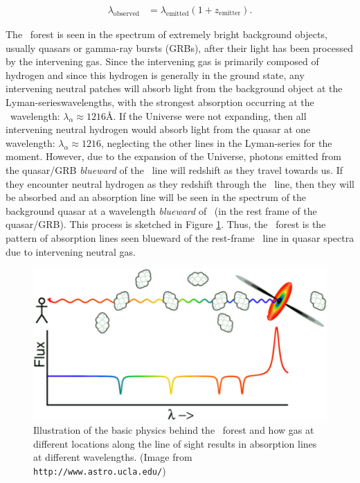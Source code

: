 \begin{align}
\lambda_{\text{observed}} &= \lambda_{\text{emitted}}(1+z_{\text{emitter}}). 
\end{align}

The \lya\ forest is seen in the spectrum of extremely bright background objects, usually quasars  or gamma-ray bursts (GRBs), after their light has been processed by the intervening gas. Since the intervening gas is primarily composed of hydrogen and since this hydrogen is generally in the ground state, any intervening neutral patches will absorb light from the background object at the Lyman-serieswavelengths, with the strongest absorption occurring at the \lya\ wavelength: $\lambda_{\alpha} \approx 1216$\AA. If the Universe were not expanding, then all intervening neutral hydrogen would absorb light from the quasar at one wavelength: $\lambda_{\alpha} \approx 1216$\angstrom, neglecting the other lines in the Lyman-series for the moment. However, due to the expansion of the Universe, photons emitted from the quasar/GRB \textit{blueward} of the \lya\ line will redshift as they travel towards us. If they encounter neutral hydrogen as they redshift through the \lya\ line, then they will be absorbed and an absorption line will be seen in the spectrum of the background quasar at a wavelength \textit{blueward} of \lya\ (in the rest frame of the quasar/GRB). This process is sketched in Figure \ref{fig:LyaCartoon}. Thus, the \lya\ forest is the pattern of absorption lines seen blueward of the rest-frame \lya\ line in quasar spectra due to intervening neutral gas. 

\begin{figure}[!p]
  \centering
  \includegraphics[width=12cm]{lyaf-75.eps}
  \caption{Illustration of the basic physics behind the \lya\ forest and how gas at different locations along the line of sight results in absorption lines at different wavelengths. (Image from {\tt http://www.astro.ucla.edu/})}
  \label{fig:LyaCartoon}
\end{figure}

